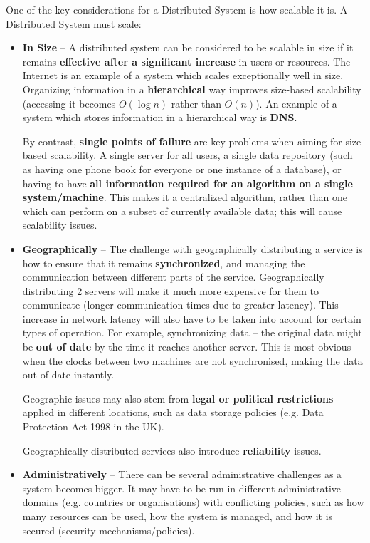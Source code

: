 \documentclass{article}
\begin{document}
One of the key considerations for a Distributed System is how scalable it is. A Distributed System must scale:
\begin{itemize}
    \item \textbf{In Size} --
    A distributed system can be considered to be scalable in size if it remains \textbf{effective after a significant increase} in users or resources. The Internet is an example of a system which scales exceptionally well in size. Organizing information in a \textbf{hierarchical} way improves size-based scalability (accessing it becomes $O(\log n)$ rather than $O(n)$). An example of a system which stores information in a hierarchical way is \textbf{DNS}. 

    By contrast, \textbf{single points of failure} are key problems when aiming for size-based scalability. A single server for all users, a single data repository (such as having one phone book for everyone or one instance of a database), or having to have \textbf{all information required for an algorithm on a single system/machine}. This makes it a centralized algorithm, rather than one which can perform on a subset of currently available data; this will cause scalability issues.
    \item \textbf{Geographically} -- 
    The challenge with geographically distributing a service is how to ensure that it remains \textbf{synchronized}, and managing the communication between different parts of the service. Geographically distributing 2 servers will make it much more expensive for them to communicate (longer communication times due to greater latency). This increase in network latency will also have to be taken into account for certain types of operation. For example, synchronizing data -- the original data might be \textbf{out of date} by the time it reaches another server. This is most obvious when the clocks between two machines are not synchronised, making the data out of date instantly.

    Geographic issues may also stem from \textbf{legal or political restrictions} applied in different locations, such as data storage policies (e.g. Data Protection Act 1998 in the UK).
    
    Geographically distributed services also introduce \textbf{reliability} issues.
    \item \textbf{Administratively} --
    There can be several administrative challenges as a system becomes bigger. It may have to be run in different administrative domains (e.g. countries or organisations) with conflicting policies, such as how many resources can be used, how the system is managed, and how it is secured (security mechanisms/policies).
\end{itemize}
\end{document}
